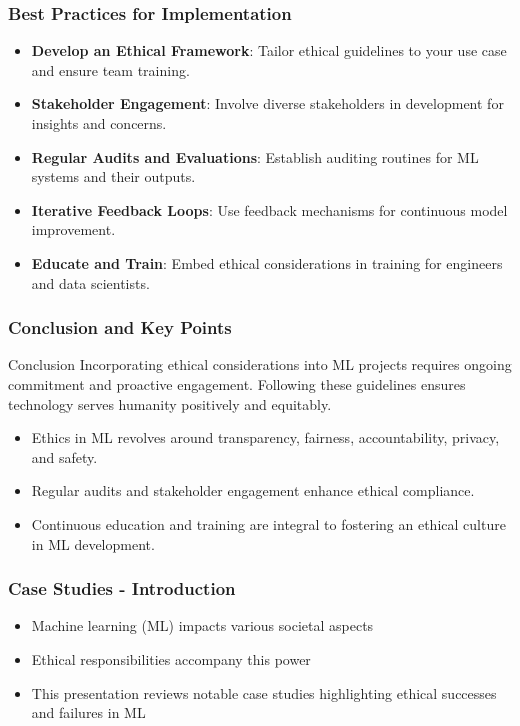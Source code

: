 \documentclass{beamer}
\begin{document}
\begin{frame}[fragile]
    \frametitle{Best Practices for Implementation}
    \begin{itemize}
        \item \textbf{Develop an Ethical Framework}: Tailor ethical guidelines to your use case and ensure team training.
        \item \textbf{Stakeholder Engagement}: Involve diverse stakeholders in development for insights and concerns.
        \item \textbf{Regular Audits and Evaluations}: Establish auditing routines for ML systems and their outputs.
        \item \textbf{Iterative Feedback Loops}: Use feedback mechanisms for continuous model improvement.
        \item \textbf{Educate and Train}: Embed ethical considerations in training for engineers and data scientists.
    \end{itemize}
\end{frame}

\begin{frame}[fragile]
    \frametitle{Conclusion and Key Points}
    \begin{block}{Conclusion}
        Incorporating ethical considerations into ML projects requires ongoing commitment and proactive engagement. Following these guidelines ensures technology serves humanity positively and equitably.
    \end{block}
    \begin{itemize}
        \item Ethics in ML revolves around transparency, fairness, accountability, privacy, and safety.
        \item Regular audits and stakeholder engagement enhance ethical compliance.
        \item Continuous education and training are integral to fostering an ethical culture in ML development.
    \end{itemize}
\end{frame}

\begin{frame}[fragile]
    \frametitle{Case Studies - Introduction}
    \begin{itemize}
        \item Machine learning (ML) impacts various societal aspects
        \item Ethical responsibilities accompany this power
        \item This presentation reviews notable case studies highlighting ethical successes and failures in ML
    \end{itemize}
\end{frame}
\end{document}
